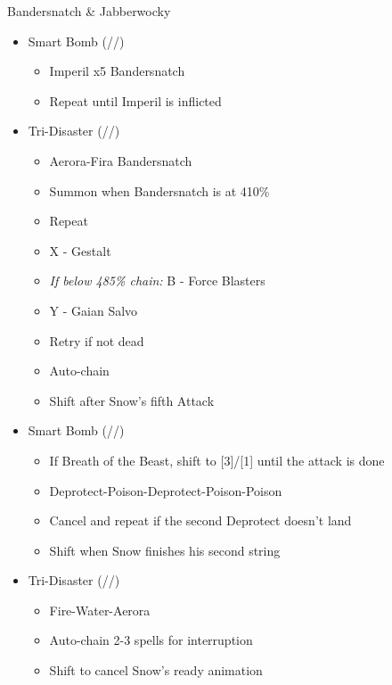 \begin{multicols}{2}
  \renewcommand{\second}{[2] Devastation (\sab/\com/\com)}
  \renewcommand{\fifth}{[5] Smart Bomb (\sab/\rav/\rav)}
  \renewcommand{\sixth}{[6] Tri-Disaster (\rav/\rav/\rav)}
  \begin{battle}[0:55]{Bandersnatch \& Jabberwocky}
    \begin{itemize}
      \item \fifth
            \begin{itemize}
              \item Imperil x5 Bandersnatch
              \item Repeat until Imperil is inflicted
            \end{itemize}
      \item \sixth
            \begin{itemize}
              \item Aerora-Fira Bandersnatch
              \item Summon when Bandersnatch is at 410\%
              \item Repeat
              \item X - Gestalt
              \item {\it If below 485\% chain:} B - Force Blasters
              \item Y - Gaian Salvo
              \item Retry if not dead
              \item Auto-chain
              \item Shift after Snow's fifth Attack
            \end{itemize}
      \item \fifth
            \begin{itemize}
              \item If Breath of the Beast, shift to [3]/[1] until the attack is done
              \item Deprotect-Poison-Deprotect-Poison-Poison
              \item Cancel and repeat if the second Deprotect doesn't land
              \item Shift when Snow finishes his second string
            \end{itemize}
      \item \sixth
            \begin{itemize}
              \item Fire-Water-Aerora
              \item Auto-chain 2-3 spells for interruption
              \item Shift to cancel Snow's ready animation

\end{itemize}
\end{itemize}
\end{battle}
\end{multicols}
